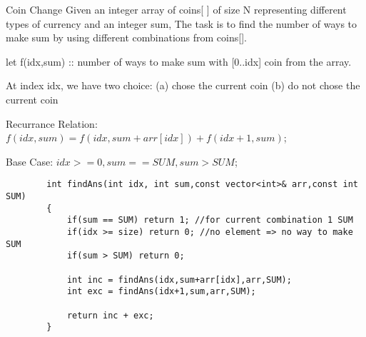 \begin{problem}{Coin Change}
    Given an integer array of coins[ ] of size N representing different types of currency and an integer sum, The task is to find the number of ways to make sum by using different combinations from coins[].
\end{problem}

\begin{solution}

    let f(idx,sum) :: number of ways to make sum with [0..idx] coin from the array.

    At index idx, we have two choice:
    (a) chose the current coin
    (b) do not chose the current coin
    
    \vspace{2mm}
    Recurrance Relation: $f(idx,sum) = f(idx,sum+arr[idx]) + f(idx+1,sum)$;

    Base Case: $idx >= 0 ,sum == SUM , sum > SUM$;

    \begin{verbatim}
        int findAns(int idx, int sum,const vector<int>& arr,const int SUM)
        {
            if(sum == SUM) return 1; //for current combination 1 SUM
            if(idx >= size) return 0; //no element => no way to make SUM
            if(sum > SUM) return 0;

            int inc = findAns(idx,sum+arr[idx],arr,SUM);
            int exc = findAns(idx+1,sum,arr,SUM);

            return inc + exc;
        }
    \end{verbatim}
  
\end{solution}